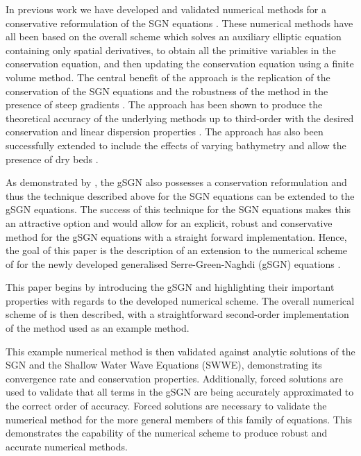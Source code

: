 \documentclass[10pt]{elsarticle}
\begin{document}
In previous work we have developed and validated numerical methods for a conservative reformulation of the SGN equations \cite{Zoppou-2014,Zoppou-etal-2016,Zoppou-etal-2017,Pitt-2019}. These numerical methods have all been based on the overall scheme which solves an auxiliary elliptic equation containing only spatial derivatives, to obtain all the primitive variables in the conservation equation, and then updating the conservation equation using a finite volume method. The central benefit of the approach is the replication of the conservation of the SGN equations \cite{Pitt-2019} and the robustness of the method in the presence of steep gradients \cite{Pitt-2018-61}. The approach has been shown to produce the theoretical accuracy of the underlying methods up to third-order \cite{Zoppou-etal-2017,Pitt-2019} with the desired conservation and linear dispersion properties \cite{Pitt-2019}. The approach has also been successfully extended to include the effects of varying bathymetry and allow the presence of dry beds \cite{Pitt-2019}.  

As demonstrated by \citet{Clamond-Dutykh-2018-237}, the gSGN also possesses a conservation reformulation and thus the technique described above for the SGN equations \cite{Zoppou-2014,Zoppou-etal-2016,Zoppou-etal-2017,Pitt-2019} can be extended to the gSGN equations. The success of this technique for the SGN equations makes this an attractive option and would allow for an explicit, robust and conservative method for the gSGN equations with a straight forward implementation. Hence, the goal of this paper is the description of an extension to the numerical scheme of \citet{Zoppou-etal-2017} for the newly developed generalised Serre-Green-Naghdi (gSGN) equations \cite{Clamond-Dutykh-2018-237}. 

This paper begins by introducing the gSGN and highlighting their important properties with regards to the developed numerical scheme. The overall numerical scheme of \citet{Zoppou-etal-2017} is then described, with a straightforward second-order implementation of the method used as an example method. 

This example numerical method is then validated against analytic solutions of the SGN and the Shallow Water Wave Equations (SWWE), demonstrating its convergence rate and conservation properties. Additionally, forced solutions are used to validate that all terms in the gSGN are being accurately approximated to the correct order of accuracy. Forced solutions are necessary to validate the numerical method for the more general members of this family of equations. This demonstrates the capability of the numerical scheme to produce robust and accurate numerical methods. 
\end{document}
